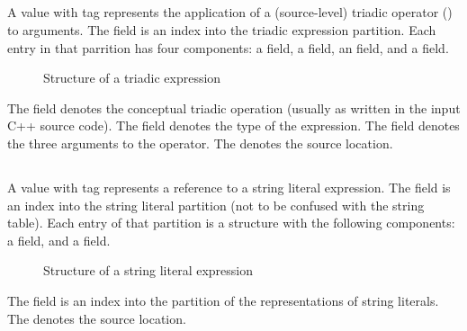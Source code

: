 
\subsection{}
\label{sec:ifc:ExprSort:Triad}

A  value with tag  represents the application of a (source-level) triadic operator () to arguments.
The  field is an index into the triadic expression partition.
Each entry in that parrition has four components: a  field, a  field, an  field, and a  field.
%
\begin{figure}[H]
	\centering
	\caption{Structure of a triadic expression}
	\label{fig:ifc-triadic-expression-structure}
\end{figure}
%
The  field denotes the conceptual triadic operation (usually as written in the input C++ source code).
The  field denotes the type of the expression.
The  field denotes the three arguments to the operator.
The  denotes the source location.



\subsection{}
\label{sec:ifc:ExprSort:String}

A  value with tag  represents a reference to a string literal
expression.  The  field is an index into the string literal partition (not to be confused with the string table).
Each entry of that partition is a structure with the following components: a  field, and a  field.
%
\begin{figure}[H]
	\centering
	\caption{Structure of a string literal expression}
	\label{fig:ifc-string-literal-expression-structure}
\end{figure}
%
The  field is an index into the partition of the representations of string literals.
The  denotes the source location.

